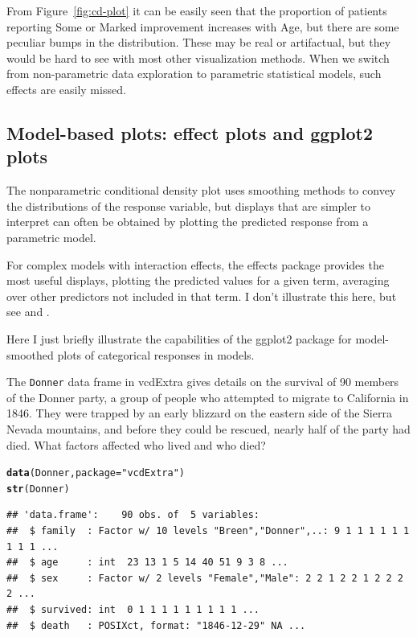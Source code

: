 \documentclass[10pt,twoside]{article}\usepackage[]{graphicx}\usepackage[]{color}
\makeatletter
\newcommand{\hlstr}[1]{\textcolor[rgb]{0.192,0.494,0.8}{#1}}%
\newcommand{\hlstd}[1]{\textcolor[rgb]{0.345,0.345,0.345}{#1}}%
\newcommand{\hlkwc}[1]{\textcolor[rgb]{0.333,0.667,0.333}{#1}}%
\newcommand{\hlkwd}[1]{\textcolor[rgb]{0.737,0.353,0.396}{\textbf{#1}}}%
\newenvironment{kframe}{%
 \def\at@end@of@kframe{}%
 \ifinner\ifhmode%
  \def\at@end@of@kframe{\end{minipage}}%
  \begin{minipage}{\columnwidth}%
 \fi\fi%
 \def\FrameCommand##1{\hskip\@totalleftmargin \hskip-\fboxsep
 \colorbox{shadecolor}{##1}\hskip-\fboxsep
     \hskip-\linewidth \hskip-\@totalleftmargin \hskip\columnwidth}%
 \MakeFramed {\advance\hsize-\width
   \@totalleftmargin\z@ \linewidth\hsize
   \@setminipage}}%
 {\par\unskip\endMakeFramed%
 \at@end@of@kframe}
\newenvironment{knitrout}{}{} %
\newcommand{\figref}[1]{Figure~\ref{#1}}
\newcommand*{\Example}{\fbox{\textbf{\emph{Example}}:} }
\newcommand{\data}[1]{\texttt{#1}}
\newcommand{\codefun}[1]{\code{#1()}}
\newcommand{\pkg}[1]{{\normalfont\fontseries{b}\selectfont #1}}
\makeatother
\begin{document}
From \figref{fig:cd-plot} it can be easily seen that the proportion
of patients reporting Some or Marked improvement increases with Age,
but there are some peculiar bumps in the distribution.
These may be real or artifactual, but they would be hard to see
with most other visualization methods.
When we switch from non-parametric data exploration to parametric
statistical models, such effects are easily missed.

\subsection[Model-based plots]{Model-based plots: effect plots and \pkg{ggplot2} plots}\label{sec:modelplots}
The nonparametric conditional density plot uses smoothing methods
to convey the distributions of the response variable,
but displays that are simpler to interpret can often be obtained by plotting
the predicted response from a parametric model.

For complex \codefun{glm} models with interaction effects, the \pkg{effects}
package  provides the most useful displays,
plotting  the predicted values for a given term, averaging over other
predictors not included in that term.  I don't illustrate this here, but
see \citet{effects:1,effects:2} and .

Here I just briefly illustrate the capabilities of the \pkg{ggplot2} package
for model-smoothed plots of categorical responses in \codefun{glm} models.

\Example
The \data{Donner} data frame in \pkg{vcdExtra} gives details on the survival
of 90 members of the Donner party,
a group of people who attempted to migrate to California in 1846.
They were trapped by an early blizzard on the eastern side of the
Sierra Nevada mountains, and before they could be rescued, 
nearly half of the party had died.
What factors affected who lived and who died?

\begin{knitrout}
\color{fgcolor}\begin{kframe}
\begin{alltt}
\hlkwd{data}\hlstd{(Donner,} \hlkwc{package}\hlstd{=}\hlstr{"vcdExtra"}\hlstd{)}
\hlkwd{str}\hlstd{(Donner)}
\end{alltt}
\begin{verbatim}
## 'data.frame':	90 obs. of  5 variables:
##  $ family  : Factor w/ 10 levels "Breen","Donner",..: 9 1 1 1 1 1 1 1 1 1 ...
##  $ age     : int  23 13 1 5 14 40 51 9 3 8 ...
##  $ sex     : Factor w/ 2 levels "Female","Male": 2 2 1 2 2 1 2 2 2 2 ...
##  $ survived: int  0 1 1 1 1 1 1 1 1 1 ...
##  $ death   : POSIXct, format: "1846-12-29" NA ...
\end{verbatim}
\end{kframe}
\end{knitrout}
\end{document}
